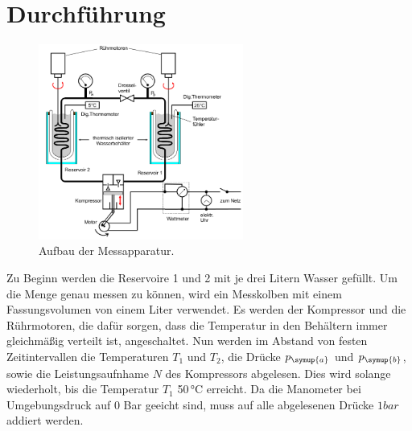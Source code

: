 \section{Durchführung}
\label{sec:Durchführung}
\begin{figure}
  \centering
  \includegraphics[width=0.60\textwidth]{messapparatur.png}
  \caption{Aufbau der Messapparatur.}
  \label{fig:aufbau}
\end{figure}
Zu Beginn werden die Reservoire 1 und 2 mit je drei Litern Wasser gefüllt. Um die
Menge genau messen zu können, wird ein Messkolben mit einem Fassungsvolumen von
einem Liter verwendet.
Es werden der Kompressor und die Rührmotoren, die dafür sorgen, dass die Temperatur in
den Behältern immer gleichmäßig verteilt ist, angeschaltet.
Nun werden im Abstand von festen Zeitintervallen die Temperaturen $T_1$ und $T_2$, die Drücke
$p_\symup{a}$ und $p_\symup{b}$, sowie die Leistungsaufnhame $N$ des Kompressors
abgelesen. Dies wird solange wiederholt, bis die Temperatur $T_1$ 50\,°C erreicht.
Da die Manometer bei Umgebungsdruck auf 0 Bar geeicht sind, muss auf alle abgelesenen
Drücke $1\si{bar}$ addiert werden.
